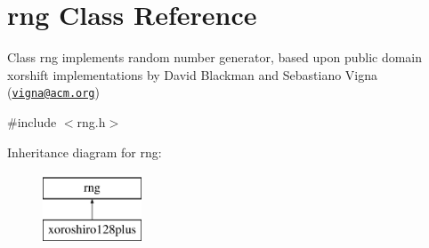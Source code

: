 \hypertarget{classrng}{}\section{rng Class Reference}
\label{classrng}


Class rng implements random number generator, based upon public domain xorshift implementations by David Blackman and Sebastiano Vigna (\href{mailto:vigna@acm.org}{\tt vigna@acm.\+org})  




{\ttfamily \#include $<$rng.\+h$>$}

Inheritance diagram for rng\+:\begin{figure}[H]
\begin{center}
\leavevmode
\includegraphics[height=2.000000cm]{classrng}
\end{center}
\end{figure}
